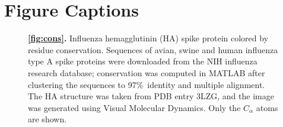 \section*{Figure Captions}
\renewcommand\thefigure{}
\newcommand\fnum[1]{\textbf{\ref{fig:#1}.} }
%
\begin{figure}[!hb]
\centering
{}
\caption{\fnum{cons}
Influenza hemagglutinin (HA) spike protein colored by residue conservation. Sequences of avian, swine and human influenza type A 
spike proteins were downloaded from the NIH influenza research database\cite{bao08}; conservation was computed in MATLAB\cite{matlab} after
clustering the sequences to 97\%~identity and multiple alignment. The HA structure was taken from PDB entry 3LZG\cite{xu10}, and the image was generated
using Visual Molecular Dynamics.\cite{Humphrey96} Only the $C_\alpha$ atoms are shown.
}
\end{figure}
%
